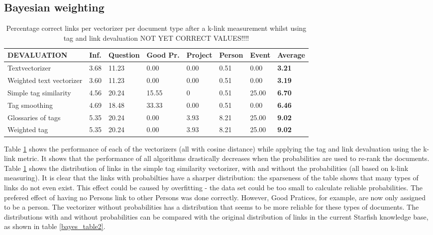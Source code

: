 \subsection{Bayesian weighting}
\begin{table}
\begin{tabular}{| l | l | l | l | l | l | l | l |}
\hline
DEVALUATION & Inf. &  Question &  Good Pr.& Project & Person &  Event & {\bf Average} \\
\hline
Textvectorizer & 3.68 & 11.23 & 0.00 & 0.00 & 0.51 & 0.00 & {\bf 3.21}\\
Weighted text vectorizer & 3.60 & 11.23 & 0.00 & 0.00 & 0.51 & 0.00 & {\bf 3.19} \\ 
Simple tag similarity & 4.56 & 20.24 & 15.55 & 0 & 0.51 & 25.00 & {\bf 6.70}\\
Tag smoothing & 4.69 & 18.48 & 33.33 & 0.00 & 0.51 & 0.00 & {\bf 6.46}\\
Glossaries of tags & 5.35 & 20.24 & 0.00 & 3.93 & 8.21 & 25.00 & {\bf 9.02}\\
Weighted tag & 5.35 & 20.24 & 0.00 & 3.93 & 8.21 & 25.00 & {\bf 9.02}\\
\hline
\end{tabular}
\caption{Percentage correct links per vectorizer per document type after a k-link measurement whilst using tag and link devaluation NOT YET CORRECT VALUES!!!!}
\label{bayes_table1}
\end{table}

Table \ref{bayes_table1} shows the performance of each of the vectorizers (all with cosine distance) while applying the tag and link devaluation using the k-link metric. It shows that the performance of all algorithms drastically decreases when the probabilities are used to re-rank the documents. Table \ref{bayes_table1}  shows the distribution of links in the simple tag similarity vectorizer, with and without the probabilities (all based on k-link measuring). It is clear that the links with probabilties have a sharper distribution: the sparseness of the table shows that many types of links do not even exist. This effect could be caused by overfitting - the data set could be too small to calculate reliable probabilities. The prefered effect of having no Persons link to other Persons was done correctly. However, Good Pratices, for example, are now only assigned to be a person. The vectorizer without probabilities has a distribution that seems to be more reliable for these types of documents. The distributions with and without probabilities can be compared with the original distribution of links in the current Starfish knowledge base, as shown in table \ref{bayes_table2}.  

